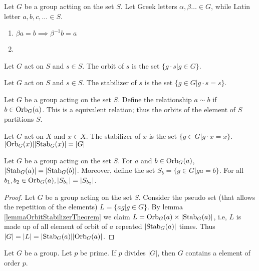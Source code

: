 \documentclass[../note.tex]{subfiles}
\begin{document}
\begin{theorem}
	Let $G$ be a group actting on the set $S$. Let Greek letters $\alpha, \beta \dots \in G$, while Latin letter $a,b,c, \dots \in S$.
	\begin{enumerate}
		\item $\beta a = b \implies \beta^{-1} b = a$ 
		\item 
	\end{enumerate}
\end{theorem}
\begin{definition}[Orbit]
	Let $G$ act on $S$ and $s \in S$. The orbit of $s$ is the set $\{g\cdot s | g \in G\}$.	
\end{definition}

\begin{definition}[Stabilizer]
	Let $G$ act on $S$ and $s \in S$. The stabilizer of $s$ is the set $\{g \in G | g\cdot s = s\}$.
\end{definition}

\begin{theorem}
	Let $G$ be a group acting on the set $S$.
	Define the relationship $a\sim b$ if $b\in \text{Orb}_{G}({a})$.
	This is a equivalent relation; thus the orbits of the element of $S$ partitions $S$.
\end{theorem}

\begin{theorem}
	Let $G$ act on $X$ and $x \in X$. The stabilizer of $x$ is the set $\{g \in G | g\cdot x = x\}$.
	$|\text{Orb}_{G}({x})||\text{Stab}_{G}({x})|=|G|$
\end{theorem}

\begin{lemma}\label{lemmaOrbitStabilizerTheorem}
	Let $G$ be a group acting on the set $S$.
	For $a$ and $b\in \text{Orb}_{G}({a})$, $|\text{Stab}_{G}({a})|=|\text{Stab}_{G}({b})|$.
	Moreover, define the set $S_b=\{g\in G| ga=b \}$. For all $b_1, b_2 \in \text{Orb}_{G}({a}), |S_{b_1}|=|S_{b_2}|$.
\end{lemma}

\begin{proof}
	Let $G$ be a group acting on the set $S$. 
	Consider the pseudo set (that allows the repetition of the elements) $L=\{ag| g\in G\}$. 
	By lemma \ref{lemmaOrbitStabilizerTheorem} we claim $L=\text{Orb}_{G}({a}) \times |\text{Stab}_{G}({a})|$, i.e, $L$ is made up of all element of orbit of $a$ repeated $|\text{Stab}_{G}({a})|$ times. Thus $|G|=|L|=|\text{Stab}_{G}({a})||\text{Orb}_{G}({a})|$.
\end{proof}

\begin{theorem}
	Let $G$ be a group. Let $p$ be prime. If $p$ divides $|G|$, then $G$ contains a element of order $p$.
\end{theorem}
\end{document}
